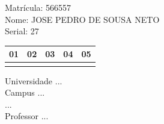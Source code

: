 \documentclass[10pt,a4paper,twocolumn]{report}
\begin{document}
Matrícula: 566557\\ Nome: JOSE PEDRO DE SOUSA NETO \\ Serial: 27\\
\begin{tabular}{|l|l|l|l|l|}\hline
01  &02  &03  &04  &05 \\ \hline 
 & & & & \\ \hline 
\end{tabular}
 \cleardoublepage 

\begin{flushleft}
Universidade ...\\
Campus ...\\
...\\
Professor ...\\
\end{flushleft}
\end{document}
